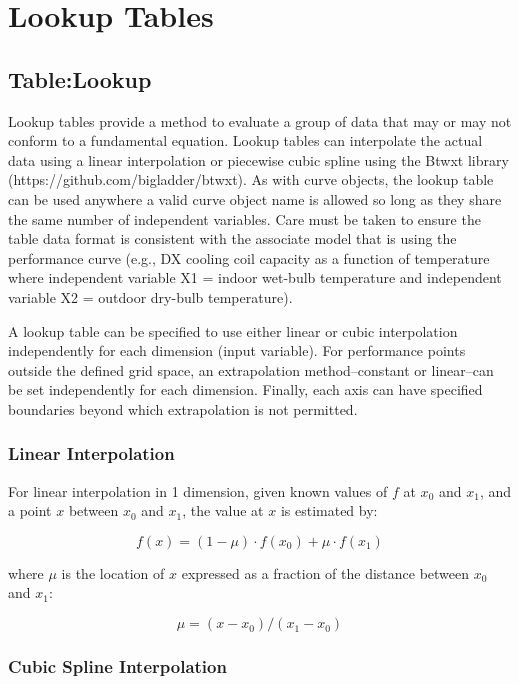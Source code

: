 \section{Lookup Tables}\label{lookup-tables}

\subsection{Table:Lookup}\label{table-lookup}

Lookup tables provide a method to evaluate a group of data that may or
may not conform to a fundamental equation. Lookup tables can interpolate
the actual data using a linear interpolation or piecewise cubic spline
using the Btwxt library (https://github.com/bigladder/btwxt).
As with curve objects, the lookup table can be used anywhere a valid
curve object name is allowed so long as they share the same number of
independent variables. Care must be taken to ensure the table data
format is consistent with the associate model that is using the
performance curve (e.g., DX cooling coil capacity as a function of
temperature where independent variable X1 = indoor wet-bulb temperature
and independent variable X2 = outdoor dry-bulb temperature).

A lookup table can be specified to use either linear or cubic interpolation
independently for each dimension (input variable). For performance
points outside the defined grid space, an extrapolation method--constant
or linear--can be set independently for each dimension. Finally, each
axis can have specified boundaries beyond which extrapolation is not
permitted.

\subsubsection{Linear Interpolation}\label{linear-interpolation}

For linear interpolation in 1 dimension, given known values of \(f\) at
\(x_0\) and \(x_1\), and a point \(x\) between \(x_0\) and \(x_1\), the
value at \(x\) is estimated by:

\[f\left(x\right) = \left(1-\mu\right) \cdot f\left(x_0\right) + \mu \cdot f\left(x_1\right)\]

where \(\mu\) is the location of \(x\) expressed as a fraction of the
distance between \(x_0\) and \(x_1\):

\[\mu = \left(x-x_0\right) / \left(x_1 - x_0\right)\]

\subsubsection{Cubic Spline
Interpolation}\label{cubic-spline-interpolation}

